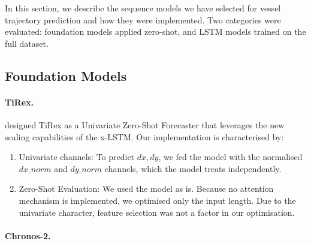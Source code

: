     \label{sec:sequenceimplementation}
    In this section, we describe the sequence models we have selected for vessel trajectory prediction and how they were implemented. Two categories were evaluated: foundation models applied zero-shot, and \ac{LSTM} models trained on the full dataset.      
        \subsection{Foundation Models} %
        \paragraph{TiRex.}
        \textcite{auer2025tirexzeroshotforecastinglongtrex} designed TiRex as a Univariate Zero-Shot Forecaster that leverages the new scaling capabilities of the \ac{x-LSTM}.
        Our implementation is characterised by:
        \begin{enumerate}
            \item Univariate channels: To predict $dx, dy$, we fed the model with the normalised $dx\_norm$ and $dy\_norm$ channels, which the model treats independently.
            \item Zero-Shot Evaluation: We used the model as is. Because no attention mechanism is implemented, we optimised only the input length. Due to the univariate character, feature selection was not a factor in our optimisation.
        \end{enumerate}
        

        
        \paragraph{Chronos-2.}
         
